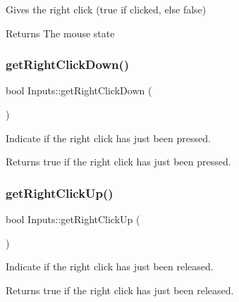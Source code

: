 Gives the right click (true if clicked, else false)

\begin{DoxyReturn}{Returns}
The mouse state 
\end{DoxyReturn}
\mbox{\label{class_inputs_a0bafaac22e7dbfcf15229ba70388f8a9}} 
\subsubsection{\texorpdfstring{get\+Right\+Click\+Down()}{getRightClickDown()}}
{\footnotesize\ttfamily bool Inputs\+::get\+Right\+Click\+Down (\begin{DoxyParamCaption}{ }\end{DoxyParamCaption})\hspace{0.3cm}{\ttfamily [static]}}

Indicate if the right click has just been pressed.

\begin{DoxyReturn}{Returns}
true if the right click has just been pressed. 
\end{DoxyReturn}
\mbox{\label{class_inputs_a7e931413d84c57ab09b769b787fc60ec}} 
\subsubsection{\texorpdfstring{get\+Right\+Click\+Up()}{getRightClickUp()}}
{\footnotesize\ttfamily bool Inputs\+::get\+Right\+Click\+Up (\begin{DoxyParamCaption}{ }\end{DoxyParamCaption})\hspace{0.3cm}{\ttfamily [static]}}

Indicate if the right click has just been released.

\begin{DoxyReturn}{Returns}
true if the right click has just been released. 
\end{DoxyReturn}
\mbox{\label{class_inputs_a496478c063e551845c3241e4006ffc08}} 
